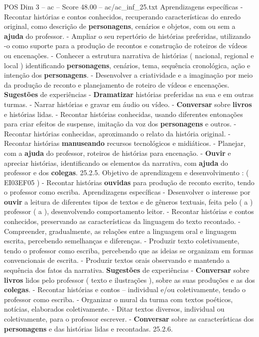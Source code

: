 \begin{textsample}{POS Dim 3 – ac – Score 48.00 – ac/ac\_inf\_25.txt}
Aprendizagens específicas - Recontar histórias e contos conhecidos, recuperando características do enredo original, como descrição de \textbf{personagens}, cenários e objetos, com ou sem a \textbf{ajuda} do professor. - Ampliar o seu repertório de histórias preferidas, utilizando -o como suporte para a produção de recontos e construção de roteiros de vídeos ou encenações. - Conhecer a estrutura narrativa de histórias ( nacional, regional e local ) identificando \textbf{personagens}, cenários, tema, sequência cronológica, ação e intenção dos \textbf{personagens}. - Desenvolver a criatividade e a imaginação por meio da produção de reconto e planejamento de roteiro de vídeos e encenações. \textbf{Sugestões} de experiências - \textbf{Dramatizar} histórias preferidas na sua e em outras turmas. - Narrar histórias e gravar em áudio ou vídeo. - \textbf{Conversar} sobre \textbf{livros} e histórias lidas. - Recontar histórias conhecidas, usando diferentes entonações para criar efeitos de suspense, imitação da voz dos \textbf{personagens} e outros. - Recontar histórias conhecidas, aproximando o relato da história original. - Recontar histórias \textbf{manuseando} recursos tecnológicos e midiáticos. - Planejar, com a \textbf{ajuda} do professor, roteiros de histórias para encenação. - \textbf{Ouvir} e apreciar histórias, identificando os elementos da narrativa, com \textbf{ajuda} do professor e dos \textbf{colegas}. 25.2.5.
Objetivo de aprendizagem e desenvolvimento : ( EI03EF05 ) - Recontar histórias \textbf{ouvidas} para produção de reconto escrito, tendo o professor como escriba.
Aprendizagens específicas - Desenvolver o interesse por \textbf{ouvir} a leitura de diferentes tipos de textos e de gêneros textuais, feita pelo ( a ) professor ( a ), desenvolvendo comportamento leitor. - Recontar histórias e contos conhecidos, preservando as características da linguagem do texto recontado. - Compreender, gradualmente, as relações entre a linguagem oral e linguagem escrita, percebendo semelhanças e diferenças. - Produzir texto coletivamente, tendo o professor como escriba, percebendo que as ideias se organizam em formas convencionais de escrita. - Produzir textos orais observando e mantendo a sequência dos fatos da narrativa. \textbf{Sugestões} de experiências - \textbf{Conversar} sobre \textbf{livros} lidos pelo professor ( texto e ilustrações ), sobre as suas produções e as dos \textbf{colegas}. - Recontar histórias e contos – individual e/ou coletivamente, tendo o professor como escriba. - Organizar o mural da turma com textos poéticos, notícias, elaborados coletivamente. - Ditar textos diversos, individual ou coletivamente, para o professor escrever. - \textbf{Conversar} sobre as características dos \textbf{personagens} e das histórias lidas e recontadas. 25.2.6.

\end{textsample}
